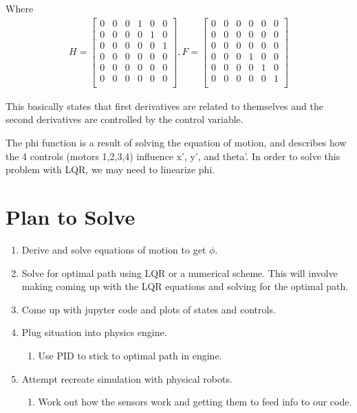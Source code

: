 \documentclass[oneside,12pt]{amsart}
\newcommand{\0}{{\vec  0 }}
\newcommand{\1}{{\mathbbm{  1} }}
\begin{document}
    Where 
    \begin{align*}
        H = 
        \begin{bmatrix} 
            0 & 0 & 0 & 1 & 0 & 0\\  
            0 & 0 & 0 & 0 & 1 & 0\\  
            0 & 0 & 0 & 0 & 0 & 1\\  
            0 & 0 & 0 & 0 & 0 & 0\\  
            0 & 0 & 0 & 0 & 0 & 0\\  
            0 & 0 & 0 & 0 & 0 & 0\\  
        \end{bmatrix},
    F =
    \begin{bmatrix} 
        0 & 0 & 0 & 0 & 0 & 0 \\  
        0 & 0 & 0 & 0 & 0 & 0 \\  
        0 & 0 & 0 & 0 & 0 & 0 \\  
        0 & 0 & 0 & 1 & 0 & 0 \\  
        0 & 0 & 0 & 0 & 1 & 0 \\  
        0 & 0 & 0 & 0 & 0 & 1 \\  
    \end{bmatrix} 
    \end{align*}
    
    This basically states that first derivatives are related to themselves and the second derivatives are controlled by the control variable. 
    
    The phi function is a result of solving the equation of motion, and describes how the 4 controls (motors 1,2,3,4) influence x’, y’, and theta’. In order to solve this problem with LQR, we may need to linearize phi.
    
    \section{Plan to Solve}
    \begin{enumerate}[label=\roman*.]
        \item Derive and solve equations of motion to get $\phi$.
        \item Solve for optimal path using LQR or a numerical scheme. This will involve making coming up with the LQR equations and solving for the optimal path.
        \item Come up with jupyter code and plots of states and controls.
        \item Plug situation into physics engine.
        \begin{enumerate}[label=\alph*.]
            \item Use PID to stick to optimal path in engine.
        \end{enumerate}
        \item Attempt recreate simulation with physical robots.
        \begin{enumerate}[label=\alph*.]
            \item Work out how the sensors work and getting them to feed info to our code. 
        \end{enumerate}
    \end{enumerate}
    
    
    
    
    
\end{document}
